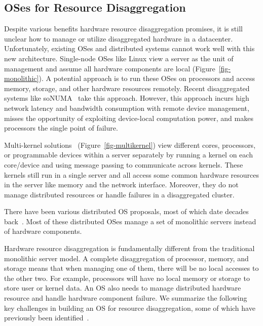\subsection{OSes for Resource Disaggregation}
Despite various benefits hardware resource disaggregation promises, 
it is still unclear how to manage or utilize disaggregated hardware in a datacenter.
Unfortunately, existing OSes and distributed systems cannot work well with this new architecture.
Single-node OSes like Linux view a server as the unit of management and assume all hardware components are local (Figure~\ref{fig-monolithic}).
A potential approach is to run these OSes on processors
and access memory, storage, and other hardware resources remotely.
Recent disaggregated systems like soNUMA~\cite{Scaleout-numa} take this approach.
However, this approach incurs high network latency and bandwidth consumption with remote device management,
misses the opportunity of exploiting device-local computation power,
and makes processors the single point of failure.

Multi-kernel solutions~\cite{Baumann-SOSP09,Barrelfish-DC,Helios-SOSP,fos-SOCC,Hive-SOSP} (Figure~\ref{fig-multikernel}) 
view different cores, processors, or programmable devices within a server separately 
by running a kernel on each core/device and using message passing to communicate across kernels.
These kernels still run in a single server and all access some common hardware resources in the server like memory and the network interface.
Moreover, they do not manage distributed resources or handle failures in a disaggregated cluster. 

There have been various distributed OS proposals,
most of which date decades back~\cite{Amoeba-Experience,Sprite,MOSIX}. %
Most of these distributed OSes manage a set of monolithic servers
instead of hardware components.

Hardware resource disaggregation is fundamentally different from the traditional monolithic server model.
A complete disaggregation of processor, memory, and storage 
means that when managing one of them, there will be no local accesses to the other two.
For example, processors will have no local memory or storage to store user or kernel data.
An OS also needs to manage distributed hardware resource and handle hardware component failure.
We summarize the following key challenges in building an OS for resource disaggregation,
some of which have previously been identified~\cite{HP-MemoryOS}.


